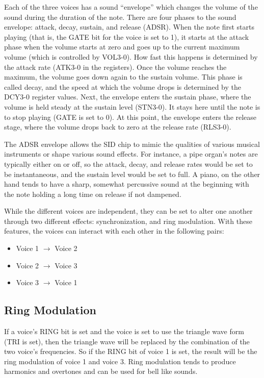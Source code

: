 Each of the three voices has a sound ``envelope'' which changes the volume of the sound during the duration of the note. There are four phases to the sound envelope: attack, decay, sustain, and release (ADSR). When the note first starts playing (that is, the GATE bit for the voice is set to 1), it starts at the attack phase when the volume starts at zero and goes up to the current maximum volume (which is controlled by VOL3-0). How fast this happens is determined by the attack rate (ATK3-0 in the registers). Once the volume reaches the maximum, the volume goes down again to the sustain volume. This phase is called decay, and the speed at which the volume drops is determined by the DCY3-0 register values. Next, the envelope enters the sustain phase, where the volume is held steady at the sustain level (STN3-0). It stays here until the note is to stop playing (GATE is set to 0). At this point, the envelope enters the release stage, where the volume drops back to zero at the release rate (RLS3-0).

The ADSR envelope allows the SID chip to mimic the qualities of various musical instruments or shape various sound effects. For instance, a pipe organ's notes are typically either on or off, so the attack, decay, and release rates would be set to be instantaneous, and the sustain level would be set to full. A piano, on the other hand tends to have a sharp, somewhat percussive sound at the beginning with the note holding a long time on release if not dampened.

While the different voices are independent, they can be set to alter one another through two different effects: synchronization, and ring modulation. With these features, the voices can interact with each other in the following pairs:

\begin{itemize}
\item Voice 1 $\rightarrow$ Voice 2
\item Voice 2 $\rightarrow$ Voice 3
\item Voice 3 $\rightarrow$ Voice 1
\end{itemize}

\subsection*{Ring Modulation}

If a voice's RING bit is set and the voice is set to use the triangle wave form (TRI is set), then the triangle wave will be replaced by the combination of the two voice's frequencies. So if the RING bit of voice 1 is set, the result will be the ring modulation of voice 1 and voice 3. Ring modulation tends to produce harmonics and overtones and can be used for bell like sounds.

